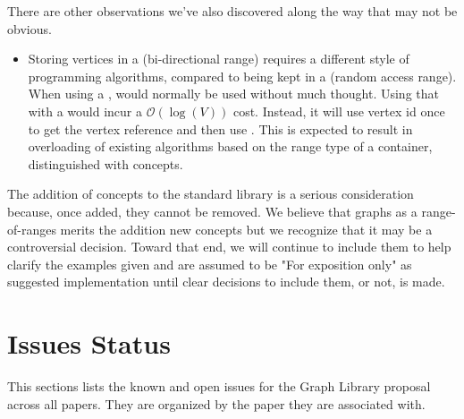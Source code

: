 There are other observations we've also discovered along the way that may not be obvious.
\begin{itemize}
      \item Storing vertices in a  (bi-directional range) requires a different style of programming 
            algorithms, compared to being kept in a  (random access range). When using a ,
             would normally be used without much thought. Using that with a  would
            incur a $\mathcal{O}(\log(V))$ cost. Instead, it will use vertex id once to get the vertex reference 
            and then use . This is expected to result in overloading of existing algorithms based on the
            range type of a container, distinguished with concepts.
\end{itemize}

The addition of concepts to the standard library is a serious consideration because, once added, they cannot 
be removed. We believe that graphs as a range-of-ranges merits the addition new concepts but we recognize that it
may be a controversial decision. Toward that end, we will continue to include them to help clarify the examples given
and are assumed to be "For exposition only" as suggested implementation until clear decisions to include them, or not, 
is made.

\section{Issues Status}
This sections lists the known and open issues for the Graph Library proposal across all papers. They are organized
by the paper they are associated with.

